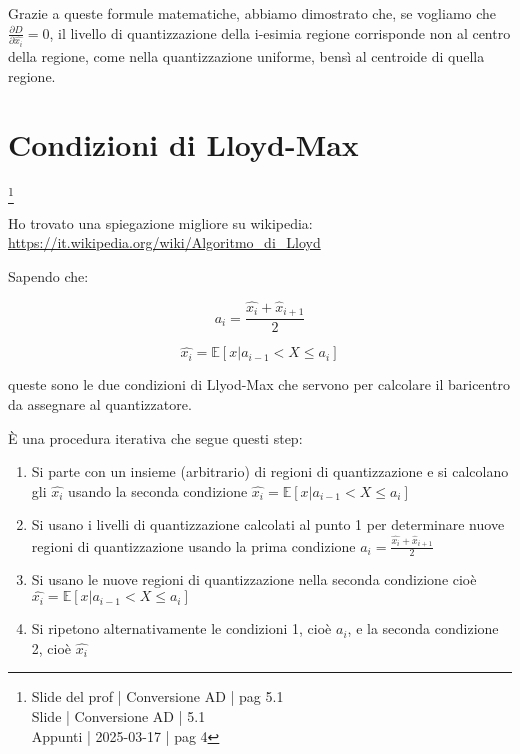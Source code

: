 Grazie a queste formule matematiche, abbiamo dimostrato che, 
se vogliamo che $\frac{\partial D}{\partial \hat{x_i}} = 0$, 
il livello di quantizzazione della i-esimia regione corrisponde non al centro della regione, come nella quantizzazione uniforme, 
bensì al centroide di quella regione. \newline 


\newpage 

\section{Condizioni di Lloyd-Max}
\footnote{Slide del prof | Conversione AD | pag 5.1 \\  
Slide | Conversione AD | 5.1\\
Appunti | 2025-03-17 | pag 4
}

\begin{tcolorbox}
    Ho trovato una spiegazione migliore su wikipedia: \\
    \url{https://it.wikipedia.org/wiki/Algoritmo_di_Lloyd}
\end{tcolorbox}


Sapendo che: 

{
    \Large 
    \begin{equation}
        a_i = \frac{\hat{x_i} + \hat{x}_{i+1}}{2}
    \end{equation}
}

{
    \Large 
    \begin{equation}
        \hat{x_i} 
        = 
        \mathbb{E} \left[ x | a_{i-1} < X \le a_i \right] 
    \end{equation}
}

queste sono le due condizioni di Llyod-Max 
che servono per calcolare il baricentro da assegnare al quantizzatore. \newline 

È una procedura iterativa che segue questi step: 

\begin{enumerate}
    \item Si parte con un insieme (arbitrario) di regioni di quantizzazione e si calcolano gli $\hat{x_i}$ usando la seconda condizione $\hat{x_i} =  \mathbb{E} \left[ x | a_{i-1} < X \le a_i \right] $ 
    \item Si usano i livelli di quantizzazione calcolati al punto 1 per determinare nuove regioni di quantizzazione usando la prima condizione $a_i = \frac{\hat{x_i} + \hat{x}_{i+1}}{2}$
    \item Si usano le nuove regioni di quantizzazione nella seconda condizione cioè $\hat{x_i} =  \mathbb{E} \left[ x | a_{i-1} < X \le a_i \right] $ 
    \item Si ripetono alternativamente le condizioni 1, cioè $a_i$, e la seconda condizione 2, cioè $\hat{x_i}$
\end{enumerate}


